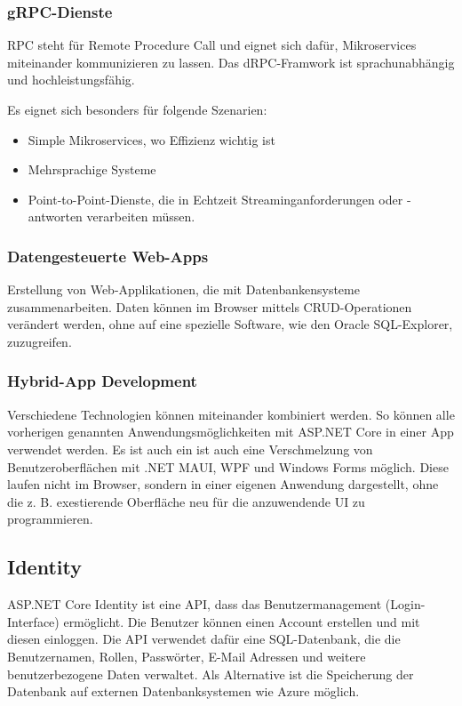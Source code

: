 \subsubsection{gRPC-Dienste}
RPC steht für Remote Procedure Call und eignet sich dafür, Mikroservices miteinander kommunizieren zu lassen.
Das dRPC-Framwork ist sprachunabhängig und hochleistungsfähig.

Es eignet sich besonders für folgende Szenarien:
\begin{itemize}
    \item Simple Mikroservices, wo Effizienz wichtig ist
    \item Mehrsprachige Systeme
    \item Point-to-Point-Dienste, die in Echtzeit Streaminganforderungen oder -antworten verarbeiten müssen.
\end{itemize}

\subsubsection{Datengesteuerte Web-Apps}
Erstellung von Web-Applikationen, die mit Datenbankensysteme zusammenarbeiten. Daten können im 
Browser mittels CRUD-Operationen verändert werden, ohne auf eine spezielle Software, wie den Oracle SQL-Explorer, zuzugreifen.

\subsubsection{Hybrid-App Development}
Verschiedene Technologien können miteinander kombiniert werden. So können alle vorherigen genannten Anwendungsmöglichkeiten 
mit ASP.NET Core in einer App verwendet werden. 
Es ist auch ein ist auch eine Verschmelzung von Benutzeroberflächen mit .NET MAUI, WPF und Windows Forms möglich. Diese laufen nicht im Browser, 
sondern in einer eigenen Anwendung dargestellt, ohne die z. B. exestierende Oberfläche neu für die anzuwendende UI zu programmieren.

\subsection{Identity}
ASP.NET Core Identity ist eine API, dass das Benutzermanagement (Login-Interface) ermöglicht. 
Die Benutzer können einen Account erstellen und mit diesen einloggen. Die API verwendet dafür eine 
SQL-Datenbank, die die Benutzernamen, Rollen, Passwörter, E-Mail Adressen und weitere benutzerbezogene Daten verwaltet. 
Als Alternative ist die Speicherung der Datenbank auf externen Datenbanksystemen wie Azure möglich.


